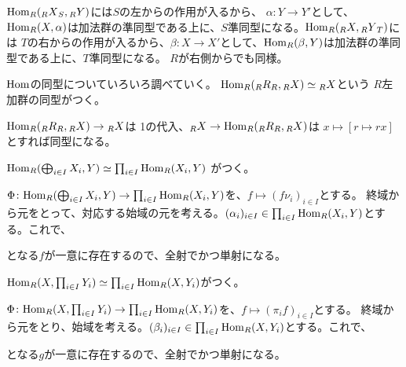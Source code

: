 \documentclass[9pt]{ltjsarticle}
\begin{document}
$\Hom_R(\Lmod{R}\Rmod{S}X,\Lmod{R}Y)$には$S$の左からの作用が入るから、
$\alpha\colon Y \to Y'$として、$\Hom_R(X,\alpha)$は加法群の準同型である上に、$S$準同型になる。$\Hom_R(\Lmod{R}X,\Lmod{R}\Rmod{T}Y)$には
$T$の右からの作用が入るから、$\beta\colon X\to X'$として、$\Hom_R(\beta,Y)$は加法群の準同型である上に、$T$準同型になる。
$R$が右側からでも同様。

$\Hom$の同型についていろいろ調べていく。
$\Hom_R(\Lmod{R}\Rmod{R}R, \Lmod{R}X) \simeq \Lmod{R}X$という
$R$左加群の同型がつく。
\begin{myproof}
  $\Hom_R(\Lmod{R}\Rmod{R}R,\Lmod{R}X) \to \Lmod{R}X$は
  1の代入、$\Lmod{R}X \to \Hom_R(\Lmod{R}\Rmod{R} R, \Lmod{R}X)$は
  $x\mapsto [r\mapsto rx]$とすれば同型になる。
\end{myproof}

$\Hom_R(\bigoplus_{i\in I}X_i, Y) \simeq \prod_{i\in I}\Hom_R(X_i,Y)$
がつく。
\begin{myproof}
  $\Phi \colon \Hom_R(\bigoplus_{i\in I}X_i, Y) \to \prod_{i\in I}\Hom_R(X_i,Y)$を、$f\mapsto (f\nu_i)_{i\in I}$とする。
  終域から元をとって、対応する始域の元を考える。$(\alpha_i)_{i\in I} \in \prod_{i\in I}\Hom_R(X_i,Y)$とする。これで、
  \begin{center}
  \end{center}
  となる$f$が一意に存在するので、全射でかつ単射になる。
\end{myproof}

$\Hom_R(X,\prod_{i\in I}Y_i) \simeq \prod_{i\in I}\Hom_R(X,Y_i)$がつく。
\begin{myproof}
$\Phi\colon \Hom_R(X,\prod_{i\in I}Y_i) \to \prod_{i\in I}\Hom_R(X,Y_i)$を、$f\mapsto (\pi_i f)_{i\in I}$とする。
終域から元をとり、始域を考える。$(\beta_i)_{i\in I}\in \prod_{i\in I}\Hom_R(X,Y_i)$とする。これで、
\begin{center}
\end{center}
となる$g$が一意に存在するので、全射でかつ単射になる。
\end{myproof}
\end{document}
